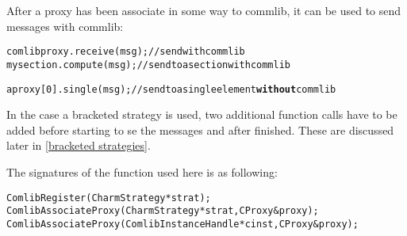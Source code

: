After a proxy has been associate in some way to commlib, it can be used to send
messages with commlib:

\begin{alltt}
  comlibproxy.receive(msg); // send with commlib
  mysection.compute(msg);   // send to a section with commlib

  aproxy[0].single(msg);    // send to a single element {\textbf{without}} commlib
\end{alltt}

In the case a bracketed strategy is used, two additional function calls have to
be added before starting to se the messages and after finished. These are
discussed later in \ref{bracketed strategies}.

The signatures of the function used here is as following:

\begin{alltt}
ComlibRegister (CharmStrategy *strat);
ComlibAssociateProxy (CharmStrategy *strat, CProxy &proxy);
ComlibAssociateProxy (ComlibInstanceHandle *cinst, CProxy &proxy);
\end{alltt}








